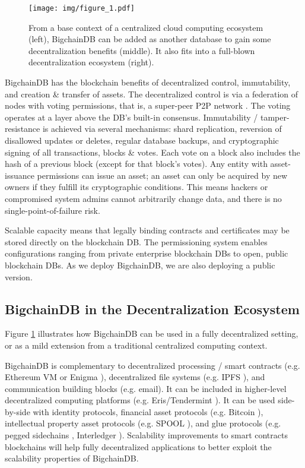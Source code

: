 \begin{figure}[!ht]
  \centering
  \texttt{[image: img/figure\_1.pdf]}
  \caption{From a base context of a centralized cloud computing ecosystem (left), BigchainDB can be added as another database to gain some decentralization benefits (middle).
  It also fits into a full-blown decentralization ecosystem (right).}
  \label{fig:bigchain_ecosystem}
\end{figure}

BigchainDB has the blockchain benefits of decentralized control, immutability, and creation \& transfer of assets.
The decentralized control is via a federation of nodes with voting permissions, that is, a super-peer P2P network \cite{ozsu2011principles}.
The voting operates at a layer above the DB’s built-in consensus.
Immutability / tamper-resistance is achieved via several mechanisms: shard replication, reversion of disallowed updates or deletes, regular database backups, and cryptographic signing of all transactions, blocks \& votes. Each vote on a block also includes the hash of a previous block (except for that block's votes).
Any entity with asset-issuance permissions can issue an asset; an asset can only be acquired by new owners if they fulfill its cryptographic conditions.
This means hackers or compromised system admins cannot arbitrarily change data, and there is no single-point-of-failure risk.

Scalable capacity means that legally binding contracts and certificates may be stored directly on the blockchain DB.
The permissioning system enables configurations ranging from private enterprise blockchain DBs to open, public blockchain DBs.
As we deploy BigchainDB, we are also deploying a public version.

\subsection{BigchainDB in the Decentralization Ecosystem}
Figure \ref{fig:bigchain_ecosystem} illustrates how BigchainDB can be used in a fully decentralized setting, or as a mild extension from a traditional centralized computing context.

BigchainDB is complementary to decentralized processing / smart contracts (e.g. Ethereum VM \cite{ethereum}\cite{buterin-ethereum} or Enigma \cite{enigma}\cite{zyskind2015enigma}), decentralized file systems (e.g. IPFS \cite{ipfs}), and communication building blocks (e.g. email).
It can be included in higher-level decentralized computing platforms (e.g. Eris/Tendermint \cite{eris}\cite{tendermint}).
It can be used side-by-side with identity protocols, financial asset protocols (e.g. Bitcoin \cite{nakamoto2009bitcoin}), intellectual property asset protocols (e.g. SPOOL \cite{dejonghe_spool}), and glue protocols (e.g. pegged sidechains \cite{back2010sidechains}, Interledger \cite{thomas2015interledger}).
Scalability improvements to smart contracts blockchains will help fully decentralized applications to better exploit the scalability properties of BigchainDB.

